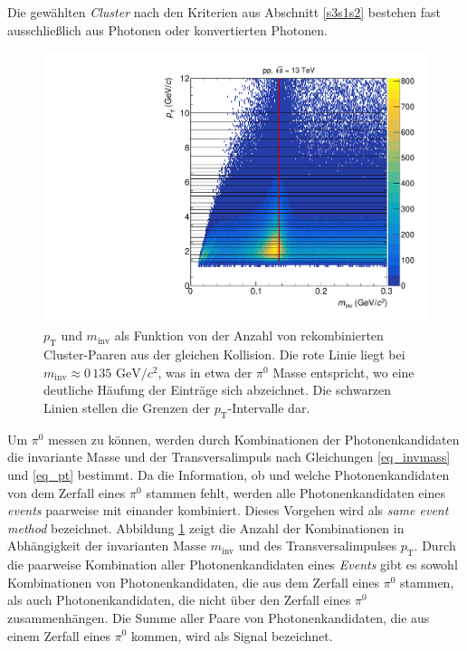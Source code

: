 Die gewählten \textit{Cluster} nach den Kriterien aus Abschnitt \ref{s3s1s2} bestehen fast ausschließlich aus Photonen oder konvertierten Photonen.
\newline
\begin{figure}[tp]
\centering
\includegraphics[width=.7\linewidth]{hInvMass_pT_Signal.pdf}
\caption{$p_\text{T}$ und $m_\text{inv}$ als Funktion von der Anzahl von rekombinierten  Cluster-Paaren aus der gleichen Kollision.
Die rote Linie liegt bei $m_{\text{inv}}\approx0\,135\text{ GeV/}c^{2}$, was in etwa der $\pi^{0}$ Masse entspricht, wo eine deutliche Häufung der Einträge sich abzeichnet.
Die schwarzen Linien stellen die Grenzen der $p_{\text{T}}$-Intervalle dar.}
\label{figInvMassPt_a}
\end{figure}
Um $\pi^{0}$ messen zu können, werden durch Kombinationen der Photonenkandidaten die invariante Masse und der Transversalimpuls nach Gleichungen \ref{eq_invmass} und \ref{eq_pt} bestimmt.
Da die Information, ob und welche Photonenkandidaten von dem Zerfall eines $\pi^{0}$ stammen fehlt, werden alle Photonenkandidaten eines \textit{events} paarweise mit einander kombiniert.
Dieses Vorgehen wird als \textit{same event method} bezeichnet.
Abbildung \ref{figInvMassPt_a} zeigt die Anzahl der Kombinationen in Abhängigkeit der invarianten Masse $m_{\text{inv}}$ und des Transversalimpulses $p_{\text{T}}$.
Durch die paarweise Kombination aller Photonenkandidaten eines \textit{Events} gibt es sowohl Kombinationen von Photonenkandidaten, die aus dem Zerfall eines $\pi^{0}$ stammen, als auch Photonenkandidaten, die nicht über den Zerfall eines $\pi^{0}$ zusammenhängen.
Die Summe aller Paare von Photonenkandidaten, die aus einem Zerfall eines $\pi^{0}$ kommen, wird als Signal bezeichnet.
